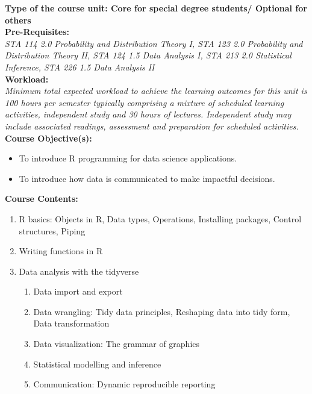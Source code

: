 \documentclass[a4paper,12pt]{article}
\begin{document}
\noindent\textbf{Type of the course unit: Core for special degree students/ Optional for others}\\

\noindent\textbf{Pre-Requisites:}\\
\noindent\textit{{ STA 114 2.0 Probability and Distribution Theory I, STA 123 2.0 Probability and Distribution Theory II, STA 124 1.5 Data Analysis I, STA 213 2.0 Statistical Inference, STA 226 1.5 Data Analysis II}}\\

\noindent\textbf{Workload:}\\
\noindent\textit{{ Minimum total expected workload to achieve the learning outcomes for this unit is 100 hours per semester typically comprising a mixture of scheduled learning activities, independent study and 30 hours of lectures. Independent study may include associated readings, assessment and preparation for scheduled activities.}}\\

\noindent\textbf{Course Objective(s):}
\begin{itemize}
	\setlength\itemsep{0.1mm}
	\item To introduce R programming for data science applications.
	\item To introduce how data is communicated to make impactful decisions.
\end{itemize}
\noindent\textbf{Course Contents:}
\begin{enumerate}[label*=\arabic*.]
	\setlength\itemsep{0.1mm}
	\item R basics: Objects in R, Data types, Operations, Installing packages, Control structures, Piping
	\item Writing functions in R
	\item Data analysis with the tidyverse
	\begin{enumerate}[label*=\arabic*.]
	\item Data import and export
	\item Data wrangling: Tidy data principles, Reshaping data into tidy form, Data transformation
	\item Data visualization: The grammar of graphics
	\item Statistical	modelling	and	inference
	\item Communication: Dynamic reproducible reporting
	\end{enumerate}
\end{enumerate}

\newpage
\end{document}
